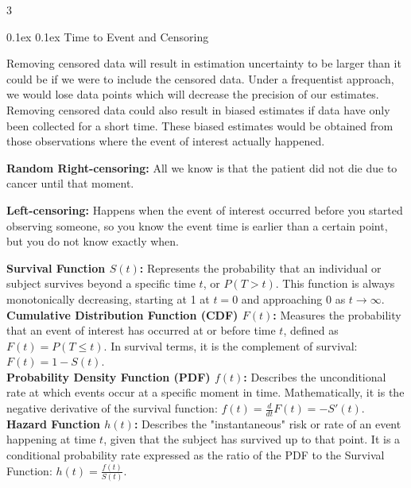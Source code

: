 \documentclass[8pt,landscape]{article}
\makeatletter
\renewcommand{\section}{\@startsection{section}{2}{0pt}%
    {0.1ex}%
    {0.1ex}%
    {\fontsize{8}{9}\bfseries\color{red}}} %
\newcommand{\smalltext}[1]{
  {\fontsize{8}{9}\selectfont\sloppy #1\par}
}
\makeatother
\begin{document}
\fontsize{8}{9}\selectfont %
\pagestyle{empty}
\begin{multicols}{3}


\section{Time to Event and Censoring}
\smalltext{
  Removing censored data will result in estimation uncertainty to be larger than it could be if we were to include the censored data. Under a frequentist approach, we would lose data points which will decrease the precision of our estimates. 
  Removing censored data could also result in biased estimates if data have only been collected for a short time. These biased estimates would be obtained from those observations where the event of interest actually happened.
}
\smalltext{
\textbf{Random Right-censoring:}
All we know is that the patient did not die due to cancer until that moment.
}
\smalltext{
  \textbf{Left-censoring:}
 Happens when the event of interest occurred before you started observing someone, so you know the event time is earlier than a certain point, but you do not know exactly when.
}

\smalltext{
\textbf{Survival Function $S(t)$:} Represents the probability that an individual or subject survives beyond a specific time $t$, or $P(T > t)$. This function is always monotonically decreasing, starting at 1 at $t=0$ and approaching 0 as $t \to \infty$.\\
\textbf{Cumulative Distribution Function (CDF) $F(t)$:} Measures the probability that an event of interest has occurred at or before time $t$, defined as $F(t) = P(T \le t)$. In survival terms, it is the complement of survival: $F(t) = 1 - S(t)$.\\
\textbf{Probability Density Function (PDF) $f(t)$:} Describes the unconditional rate at which events occur at a specific moment in time. Mathematically, it is the negative derivative of the survival function: $f(t) = \frac{d}{dt} F(t) = -S'(t)$.\\
\textbf{Hazard Function $h(t)$:} Describes the "instantaneous" risk or rate of an event happening at time $t$, given that the subject has survived up to that point. It is a conditional probability rate expressed as the ratio of the PDF to the Survival Function: $h(t) = \frac{f(t)}{S(t)}$.
}

\end{multicols}
\end{document}
